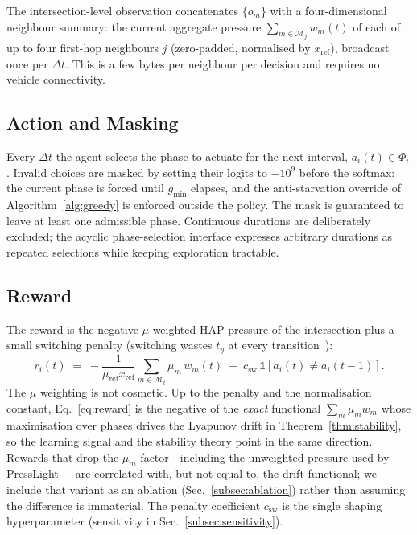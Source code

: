 \documentclass[journal]{IEEEtran}
\newcommand{\Mset}{\mathcal{M}}
\begin{document}
The intersection-level observation concatenates $\{o_m\}$ with a
four-dimensional neighbour summary: the current aggregate pressure
$\sum_{m\in\Mset_j} w_m(t)$ of each of up to four first-hop neighbours
$j$ (zero-padded, normalised by $x_{\mathrm{ref}}$), broadcast once per
$\Delta t$. This is a few bytes per neighbour per decision and requires
no vehicle connectivity.

\subsection{Action and Masking}
Every $\Delta t$ the agent selects the phase to actuate for the next
interval, $a_i(t) \in \Phi_i$. Invalid choices are masked by setting
their logits to $-10^{9}$ before the softmax: the current phase is forced
until $g_{\min}$ elapses, and the anti-starvation override of
Algorithm~\ref{alg:greedy} is enforced outside the policy. The mask is
guaranteed to leave at least one admissible phase. Continuous durations
are deliberately excluded; the acyclic phase-selection interface
expresses arbitrary durations as repeated selections while keeping
exploration tractable.

\subsection{Reward}
\label{subsec:reward}
The reward is the negative $\mu$-weighted HAP pressure of the
intersection plus a small switching penalty (switching wastes $t_y$ at
every transition~\cite{b_levin}):
\begin{equation}
r_i(t) \;=\; -\frac{1}{\mu_{\mathrm{ref}} x_{\mathrm{ref}}}
 \sum_{m \in \Mset_i} \mu_m\, w_m(t)
 \;-\; c_{\mathrm{sw}}\,\mathbb{1}[a_i(t)\neq a_i(t-1)].
\label{eq:reward}
\end{equation}
The $\mu$ weighting is not cosmetic. Up to the penalty and the
normalisation constant, Eq.~\eqref{eq:reward} is the negative of the
\emph{exact} functional
$\sum_m \mu_m w_m$ whose maximisation over phases drives the Lyapunov
drift in Theorem~\ref{thm:stability}, so the learning signal and the
stability theory point in the same direction. Rewards that drop the
$\mu_m$ factor---including the unweighted pressure used by
PressLight~\cite{b_presslight}---are correlated with, but not equal to,
the drift functional; we include that variant as an ablation
(Sec.~\ref{subsec:ablation}) rather than assuming the difference is
immaterial. The penalty coefficient $c_{\mathrm{sw}}$ is the single
shaping hyperparameter (sensitivity in Sec.~\ref{subsec:sensitivity}).
\end{document}
